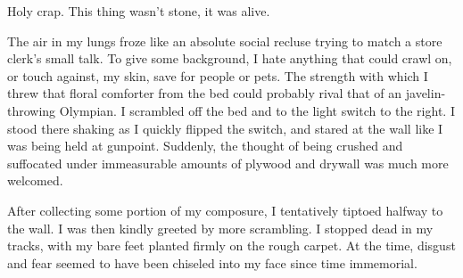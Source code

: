 \documentclass[12pt]{article}
\begin{document}
Holy crap.  This thing wasn't stone, it was alive.

The air in my lungs froze like an absolute social recluse trying to match a store clerk's small talk.  To give some background, I hate anything that could crawl on, or touch against, my skin, save for people or pets.  The strength with which I threw that floral comforter from the bed could probably rival that of an javelin-throwing Olympian.  I scrambled off the bed and to the light switch to the right.  I stood there shaking as I quickly flipped the switch, and stared at the wall like I was being held at gunpoint.  Suddenly, the thought of being crushed and suffocated under immeasurable amounts of plywood and drywall was much more welcomed.

After collecting some portion of my composure, I tentatively tiptoed halfway to the wall.  I was then kindly greeted by more scrambling.  I stopped dead in my tracks, with my bare feet planted firmly on the rough carpet.  At the time, disgust and fear seemed to have been chiseled into my face since time immemorial.
\end{document}
